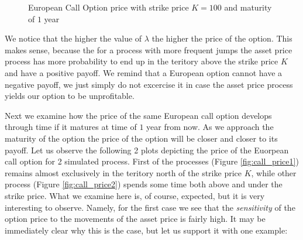 \documentclass[times, utf8, diplomski]{fer}
\begin{document}
\begin{figure}[ht]
\centering

\caption{European Call Option price with strike price $K=100$ and maturity of $1$ year}
\label{fig:call_prices_different_lambdas}
\end{figure}

We notice that the higher the value of $\lambda$ the higher the price of the option. This makes sense, because the for a process with more frequent jumps the asset price process has more probability to end up in the teritory above the strike price $K$ and have a positive payoff. We remind that a European option cannot have a negative payoff, we just simply do not excercise it in case the asset price process yields our option to be unprofitable. 

\noindent Next we examine how the price of the same European call option develops through time if it matures at time of $1$ year from now. As we approach the maturity of the option the price of the option will be closer and closer to its payoff. Let us observe the following 2 plots depicting the price of the Euorpean call option for 2 simulated process. First of the processes (Figure \ref{fig:call_price1}) remains almost exclusively in the teritory north of the strike price $K$, while other process (Figure \ref{fig:call_price2}) spends some time both above and under the strike price. What we examine here is, of course, expected, but it is very interesting to observe. Namely, for the first case we see that the \textit{sensitivity} of the option price to the movements of the asset price is fairly high. It may be immediately clear why this is the case, but let us support it with one example:
\end{document}
